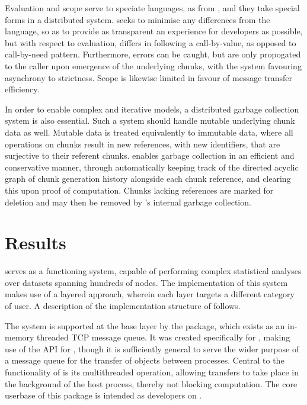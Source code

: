 \documentclass[letterpaper, inpress]{jds} %
\begin{document}
Evaluation and scope serve to speciate languages, as  from , and they take special forms in a distributed system.
 seeks to minimise any differences from the  language, so as to provide as transparent an experience for developers as possible, but with respect to evaluation, differs in following a call-by-value, as opposed to call-by-need pattern. Furthermore, errors can be caught, but are only propogated to the caller upon emergence of the underlying chunks, with the system favouring asynchrony to strictness. Scope is likewise limited in favour of message transfer efficiency.

In order to enable complex and iterative models, a distributed garbage collection system is also essential.
Such a system should handle mutable underlying chunk data as well.
Mutable data is treated equivalently to immutable data, where all operations on chunks result in new references, with new identifiers, that are surjective to their referent chunks.
 enables garbage collection in an efficient and conservative manner, through automatically keeping track of the directed acyclic graph of chunk generation history alongside each chunk reference, and clearing this upon proof of computation.
Chunks lacking references are marked for deletion and may then be removed by 's internal garbage collection.

\section{Results}

 serves as a functioning system, capable of performing complex statistical analyses over datasets spanning hundreds of nodes.
The implementation of this system makes use of a layered approach, wherein each layer targets a different category of user.
A description of the implementation structure of  follows.

The system is supported at the base layer by the  package, which exists as an in-memory threaded TCP message queue.
It was created specifically for , making use of the  API for , though it is sufficiently general to serve the wider purpose of a message queue for the transfer of  objects between  processes.
Central to the functionality of  is its multithreaded operation, allowing transfers to take place in the background of the host  process, thereby not blocking computation.
The core userbase of this package is intended as developers on .
\end{document}
